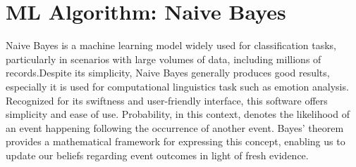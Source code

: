 \section{ML Algorithm: Naive Bayes}
Naive Bayes is a machine learning model widely used for classification tasks, particularly in scenarios with large volumes of data, including millions of records.Despite its simplicity, Naive Bayes generally produces good results, especially it is used for computational linguistics task such as emotion analysis. Recognized for its swiftness and user-friendly interface, this software offers simplicity and ease of use. Probability, in this context, denotes the likelihood of an event happening following the occurrence of another event. Bayes' theorem provides a mathematical framework for expressing this concept, enabling us to update our beliefs regarding event outcomes in light of fresh evidence.

